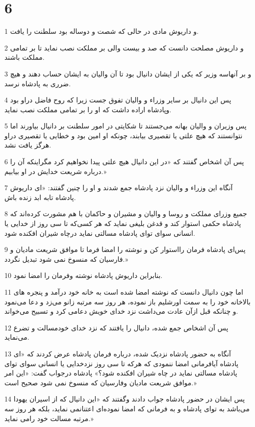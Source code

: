 \chapter{6}

\par 1 و داریوش مادی در حالی که شصت و دوساله بود سلطنت را یافت.
\par 2 و داریوش مصلحت دانست که صد و بیست والی بر مملکت نصب نماید تا بر تمامی مملکت باشند.
\par 3 و بر آنهاسه وزیر که یکی از ایشان دانیال بود تا آن والیان به ایشان حساب دهند و هیچ ضرری به پادشاه نرسد.
\par 4 پس این دانیال بر سایر وزراء و والیان تفوق جست زیرا که روح فاضل دراو بود وپادشاه اراده داشت که او را بر تمامی مملکت نصب نماید.
\par 5 پس وزیران و والیان بهانه می‌جستند تا شکایتی در امور سلطنت بر دانیال بیاورند اما نتوانستند که هیچ علتی یا تقصیری بیابند، چونکه او امین بود و خطایی یا تقصیری دراو هرگز یافت نشد.
\par 6 پس آن اشخاص گفتند که «در این دانیال هیچ علتی پیدا نخواهیم کرد مگراینکه آن را درباره شریعت خدایش در او بیابیم.»
\par 7 آنگاه این وزراء و والیان نزد پادشاه جمع شدند و او را چنین گفتند: «ای داریوش پادشاه تابه ابد زنده باش.
\par 8 جمیع وزرای مملکت و روسا و والیان و مشیران و حاکمان با هم مشورت کرده‌اند که پادشاه حکمی استوار کند و قدغن بلیغی نماید که هر کسی‌که تا سی روز از خدایی یا انسانی سوای تو‌ای پادشاه مسالتی نماید درچاه شیران افکنده شود.
\par 9 پس‌ای پادشاه فرمان رااستوار کن و نوشته را امضا فرما تا موافق شریعت مادیان و فارسیان که منسوخ نمی شود تبدیل نگردد.»
\par 10 بنابراین داریوش پادشاه نوشته وفرمان را امضا نمود.
\par 11 اما چون دانیال دانست که نوشته امضا شده است به خانه خود درآمد و پنجره های بالاخانه خود را به سمت اورشلیم باز نموده، هر روز سه مرتبه زانو می‌زد و دعا می‌نمود و چنانکه قبل ازآن عادت می‌داشت نزد خدای خویش دعامی کرد و تسبیح می‌خواند.
\par 12 پس آن اشخاص جمع شده، دانیال را یافتند که نزد خدای خودمسالت و تضرع می‌نماید.
\par 13 آنگاه به حضور پادشاه نزدیک شده، درباره فرمان پادشاه عرض کردند که «ای پادشاه آیافرمانی امضا ننمودی که هر‌که تا سی روز نزدخدایی یا انسانی سوای تو‌ای پادشاه مسالتی نماید در چاه شیران افکنده شود؟» پادشاه درجواب گفت: «این امر موافق شریعت مادیان وفارسیان که منسوخ نمی شود صحیح است.»
\par 14 پس ایشان در حضور پادشاه جواب دادند وگفتند که «این دانیال که از اسیران یهودا می‌باشد به تو‌ای پادشاه و به فرمانی که امضا نموده‌ای اعتنانمی نماید، بلکه هر روز سه مرتبه مسالت خود رامی نماید.»
